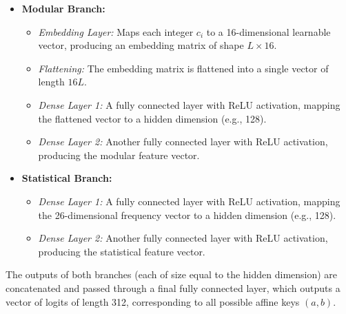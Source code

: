 \documentclass[manuscript,screen,acmtog,natbib=false]{acmart}
\begin{document}
    \begin{itemize}
        \item \textbf{Modular Branch:}
        \begin{itemize}
            \item \emph{Embedding Layer:} Maps each integer $c_i$ to a 16-dimensional learnable vector, producing an embedding matrix of shape $L \times 16$.
            \item \emph{Flattening:} The embedding matrix is flattened into a single vector of length $16L$.
            \item \emph{Dense Layer 1:} A fully connected layer with ReLU activation, mapping the flattened vector to a hidden dimension (e.g., 128).
            \item \emph{Dense Layer 2:} Another fully connected layer with ReLU activation, producing the modular feature vector.
        \end{itemize}
        \item \textbf{Statistical Branch:}
        \begin{itemize}
            \item \emph{Dense Layer 1:} A fully connected layer with ReLU activation, mapping the 26-dimensional frequency vector to a hidden dimension (e.g., 128).
            \item \emph{Dense Layer 2:} Another fully connected layer with ReLU activation, producing the statistical feature vector.
        \end{itemize}
    \end{itemize}

    The outputs of both branches (each of size equal to the hidden dimension) are concatenated and passed through a final fully connected layer, which outputs a vector of logits of length 312, corresponding to all possible affine keys $(a, b)$.
\end{document}
